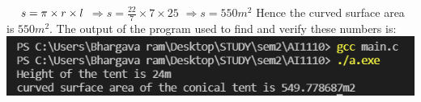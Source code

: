 \documentclass[12pt]{article}
\begin{document}
  $\hspace*{12pt} s = \pi \times r \times l $ \newline
  $\Rightarrow  s = \frac{22}{7} \times 7 \times 25 $ \newline
  $\Rightarrow  s = 550 m^2 $ \newline
  Hence the curved surface area is $ 550 m^2 $. \newline \newline
  The output of the program used to find and verify these numbers
  is: \newline \newline \newline 
  \includegraphics[width=\textwidth]{output.png}\newline   
\end{document}
